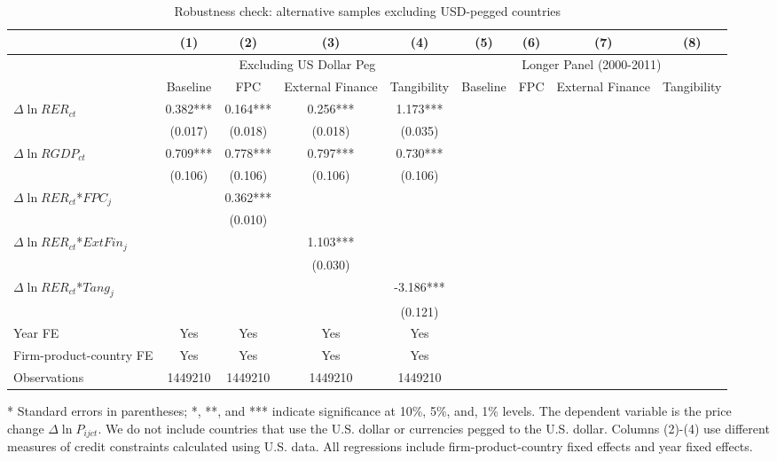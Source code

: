 \documentclass[12pt]{article}
\begin{document}
\begin{table}
	\centering
	\caption{Robustness check: alternative samples excluding USD-pegged countries}
	\begin{threeparttable}
	\begin{tabular}{lcccccccc}
		\toprule
		& (1)   & (2)   & (3)   & (4) & (5)   & (6)   & (7)   & (8)\\
		\midrule
		& \multicolumn{4}{c}{Excluding US Dollar Peg} & \multicolumn{4}{c}{Longer Panel (2000-2011)}\\
		& Baseline & FPC   & External Finance & Tangibility & Baseline & FPC   & External Finance & Tangibility \\
		\midrule
		$\Delta \ln RER_{ct}$ & 0.382*** & 0.164*** & 0.256*** & 1.173*** &&&&\\
		& (0.017) & (0.018) & (0.018) & (0.035) &&&&\\
		$\Delta \ln RGDP_{ct}$ & 0.709*** & 0.778*** & 0.797*** & 0.730*** &&&&\\
		& (0.106) & (0.106) & (0.106) & (0.106) &&&&\\
		$\Delta \ln RER_{ct}$*$FPC_{j}$ &       & 0.362*** &       &  &&&& \\
		&       & (0.010) &       &  &&&&\\
		$\Delta \ln RER_{ct}$*$ExtFin_{j}$ &       &       & 1.103*** &  &&&&\\
		&       &       & (0.030) &  &&&&\\
		$\Delta \ln RER_{ct}$*$Tang_{j}$ &       &       &       & -3.186*** &&&&\\
		&       &       &       & (0.121) &&&&\\
		Year FE  &   Yes    & Yes   & Yes   & Yes &&&&\\
		Firm-product-country FE &   Yes    & Yes   & Yes   & Yes &&&&\\
		Observations & 1449210 & 1449210 & 1449210 & 1449210 &&&&\\
		\bottomrule
	\end{tabular}
	\begin{tablenotes}
		\footnotesize
		\item[*] Standard errors in parentheses; *, **, and *** indicate significance at 10\%, 5\%, and, 1\% levels. The dependent variable is the price change $\Delta \ln P_{ijct}$. We do not include countries that use the U.S. dollar or currencies pegged to the U.S. dollar. Columns (2)-(4) use different measures of credit constraints calculated using U.S. data. All regressions include firm-product-country fixed effects and year fixed effects.
	\end{tablenotes}
        \end{threeparttable}
        \label{tab.robust.nopeg}
\end{table}
\end{document}
